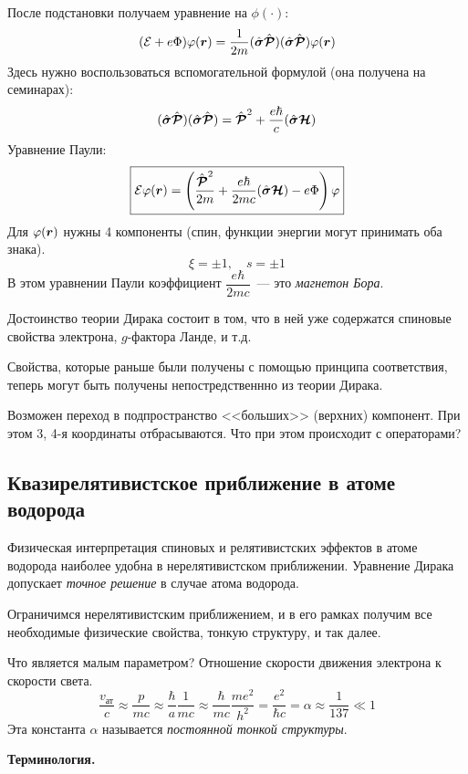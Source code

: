 После подстановки получаем уравнение на $\phi(\cdot)$:
$$
    (\mathcal E + e \Phi) \phi(\bf r) = \dfrac{1}{2m} (\hat{\bf \sigma} \hat{\bf{\mathcal P}})(\hat{\bf \sigma} \hat{\bf{\mathcal P}}) \phi(\bf r)
$$
Здесь нужно воспользоваться вспомогательной формулой (она получена на семинарах):
$$
    (\hat{\bf \sigma} \hat{\bf{\mathcal P}})(\hat{\bf \sigma} \hat{\bf{\mathcal P}}) = \hat{\bf{\mathcal P}}^2 + \dfrac{e \hbar}{c} (\hat{\bf \sigma} \bf {\mathcal H})
$$
Уравнение Паули:
$$
    \boxed{
        \mathcal E \phi(\bf r) = \left(
            \dfrac{\hat{\bf{\mathcal P}}^2}{2m} + \dfrac{e \hbar}{2mc} (\hat{\bf \sigma} \bf{\mathcal H}) - e \Phi
        \right) \phi
    }
$$
Для $\phi(\bf r)$ нужны 4 компоненты (спин, функции энергии могут принимать оба знака).
$$
    \xi = \pm 1, \quad s = \pm 1
$$
В этом уравнении Паули коэффициент $\dfrac{e \hbar}{2mc}$~--- это \emph{магнетон Бора}.

Достоинство теории Дирака состоит в том, что в ней уже содержатся спиновые свойства электрона, $g$-фактора Ланде, и т.д.

Свойства, которые раньше были получены с помощью принципа соответствия, теперь могут быть получены непостредственнно из теории Дирака.

Возможен переход в подпространство <<больших>> (верхних) компонент. При этом 3, 4-я координаты отбрасываются. Что при этом происходит с операторами? 

\subsection{Квазирелятивистское приближение в атоме водорода}

Физическая интерпретация спиновых и релятивистских эффектов в атоме водорода наиболее удобна в нерелятивистском приближении. Уравнение Дирака допускает \emph{точное решение} в случае атома водорода.

Ограничимся нерелятивистским приближением, и в его рамках получим все необходимые физические свойства, тонкую структуру, и так далее.

Что является малым параметром? Отношение скорости движения электрона к скорости света.
$$
    \dfrac{v_{\text{ат}}}{c} \approx \dfrac{p}{mc} \approx \dfrac{\hbar}{a} \dfrac{1}{mc} \approx \dfrac{\hbar}{mc} \dfrac{me^2}{h^2} = \dfrac{e^2}{\hbar c} = \alpha \approx \dfrac{1}{137} \ll 1
$$ 
Эта константа $\alpha$ называется \emph{постоянной тонкой структуры}.

\textbf{Терминология.}

